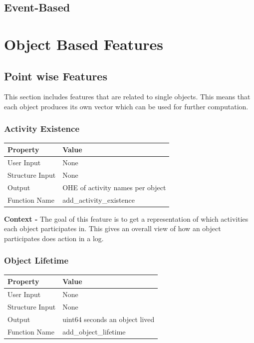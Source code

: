 \documentclass{article}
\begin{document}
\subsection{Event-Based}
\section{Object Based Features}
\subsection{Point wise Features}
This section includes features that are related to single objects. This means that each object produces its own vector which can be used for further computation.
\subsubsection{Activity Existence}
\begin{center}
	\begin{tabular}{| p{3cm} p{7cm} |}
		\hline
		\textbf{Property} & \textbf{Value}\\
		\hline
		User Input & None\\
		Structure Input & None\\
		Output & OHE of activity names per object\\
		Function Name & add\_activity\_existence\\
		\hline
	\end{tabular}
\end{center}

\textbf{Context -} The goal of this feature is to get a representation of which activities each object participates in. This gives an overall view of how an object participates does action in a log.\\

\subsubsection{Object Lifetime}
\begin{center}
	\begin{tabular}{| p{3cm} p{7cm} |}
		\hline
		\textbf{Property} & \textbf{Value}\\
		\hline
		User Input & None\\
		Structure Input & None\\
		Output & uint64 seconds an object lived\\
		Function Name & add\_object\_lifetime\\
		\hline
	\end{tabular}
\end{center}
\end{document}
